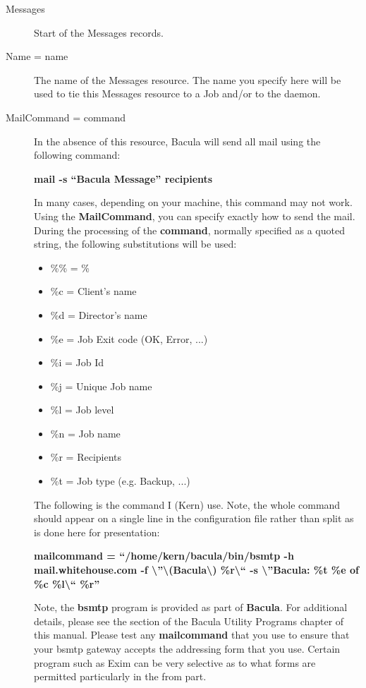 \begin{description}

\item [Messages]
   Start of the Messages records.  

\item [Name = \lt{}name\gt{}]
   The name of the Messages resource.  The name you specify here will be used to
tie this Messages  resource to a Job and/or to the daemon.  
\label{mailcommand}

\item [MailCommand = \lt{}command\gt{}]
   In the absence of this resource,  Bacula will send all mail using the
following command:  

{\bf mail -s ``Bacula Message'' \lt{}recipients\gt{}}  

In many cases, depending on your machine, this command may not work.  Using
the {\bf MailCommand}, you can specify exactly how to send  the mail. During
the processing of the {\bf command}, normally  specified as a quoted string,
the following substitutions will be  used:  

\begin{itemize}
\item \%\% = \%  
\item \%c = Client's name  
\item \%d = Director's name  
\item \%e = Job Exit code (OK, Error, ...)  
\item \%i = Job Id  
\item \%j = Unique Job name  
\item \%l = Job level  
\item \%n = Job name  
\item \%r = Recipients  
\item \%t = Job type (e.g. Backup, ...)  
   \end{itemize}

The following is the command I (Kern) use. Note, the whole  command should
appear on a single line in the configuration file  rather than split as is
done here for presentation:  

{\bf mailcommand = ``/home/kern/bacula/bin/bsmtp -h mail.whitehouse.com -f
\textbackslash{}''\textbackslash{}(Bacula\textbackslash{})
\%r\textbackslash{}`` -s \textbackslash{}''Bacula: \%t \%e of \%c
\%l\textbackslash{}`` \%r''  }

Note, the {\bf bsmtp} program is provided as part of {\bf Bacula}.  For
additional details, please see the 
 section of
the  Bacula Utility Programs chapter of this manual. Please test any  {\bf
mailcommand} that you use to ensure that your bsmtp gateway accepts  the
addressing form that you use. Certain program such as Exim can be very 
selective as to what forms are permitted particularly in the from part.  


\end{description}
